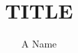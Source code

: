 \documentclass[a4paper,12pt,notitlepage]{article}
\title{TITLE}
\author{A Name}
\date{}
\begin{document}
\maketitle

\begin{abstract}


\end{abstract}

 
\end{document}
